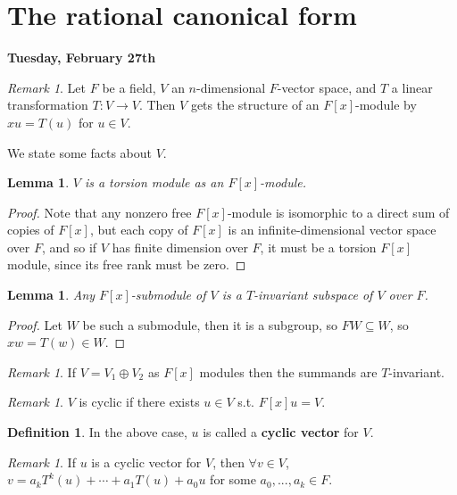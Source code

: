 \documentclass[9pt,reqno,twoside]{amsbook}
\theoremstyle{plain}
\numberwithin{section}{chapter}
\numberwithin{equation}{chapter}
\newtheorem{lem}[theorem]{Lemma}
\theoremstyle{definition}
\newtheorem{Def}[theorem]{Definition}
\theoremstyle{remark}
\newtheorem{rem}[theorem]{Remark}
\theoremstyle{plain}
\newcommand{\sub}{\subseteq}
\begin{document}
\section{The rational canonical form}

\textbf{Tuesday, February 27th}

\begin{rem}
Let $F$ be a field, $V$ an $n$-dimensional $F$-vector space, and $T$ a linear transformation $T:V \to V$. Then $V$ gets the structure of an $F[x]$-module by $xu = T(u)$ for $u \in V$. 
\end{rem}

We state some facts about $V$. 

\begin{lem}
$V$ is a torsion module as an $F[x]$-module.  
\end{lem}

\begin{proof}
Note that any nonzero free $F[x]$-module is isomorphic to a direct sum of copies of $F[x]$, but each copy of $F[x]$ is an infinite-dimensional vector space over $F$, and so if $V$ has finite dimension over $F$, it must be a torsion $F[x]$ module, since its free rank must be zero. 
\end{proof}

\begin{lem}
Any $F[x]$-submodule of $V$ is a $T$-invariant subspace of $V$ over $F$. 
\end{lem}

\begin{proof}
Let $W$ be such a submodule, then it is a subgroup, so $FW\sub W$, so $xw = T(w) \in W$. 
\end{proof}

\begin{rem}
If $V = V_1 \oplus V_2$ as $F[x]$ modules then the summands are $T$-invariant. 
\end{rem}

\begin{rem}
$V$ is cyclic if there exists $u \in V$ s.t. $F[x]u = V$. 
\end{rem}

\begin{Def}
In the above case, $u$ is called a \textbf{cyclic vector} for $V$. 
\end{Def}

\begin{rem}
If $u$ is a cyclic vector for $V$, then $\forall v \in V$, $v = a_kT^k(u) + \cdots + a_1T(u) + a_0u$ for some $a_0,...,a_k \in F$. 
\end{rem}
\end{document}
